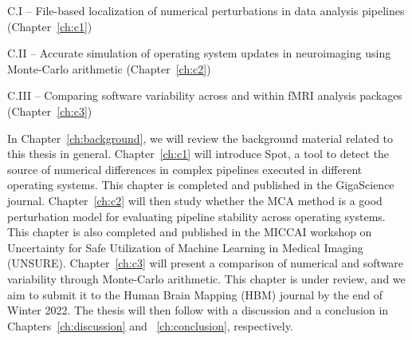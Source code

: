 C.I – File-based localization of numerical perturbations in data analysis pipelines (Chapter~\ref{ch:c1})

C.II – Accurate simulation of operating system updates in neuroimaging using Monte-Carlo arithmetic (Chapter~\ref{ch:c2})

C.III – Comparing software variability across and within fMRI analysis packages (Chapter~\ref{ch:c3})


In Chapter~\ref{ch:background}, we will review the background material related to this thesis in general.
Chapter~\ref{ch:c1} will introduce Spot, a tool to detect the source of numerical differences in complex pipelines
executed in different operating systems. This chapter is completed and published in the
GigaScience journal. Chapter~\ref{ch:c2} will then study whether the MCA method is a good perturbation
model for evaluating pipeline stability across operating systems. This chapter is also completed and published
in the MICCAI workshop on Uncertainty for Safe Utilization of Machine Learning in Medical Imaging (UNSURE).
Chapter~\ref{ch:c3} will present a comparison of numerical and software variability through Monte-Carlo arithmetic.
This chapter is under review, and we aim to submit it to the Human Brain Mapping (HBM) journal by the end of Winter 2022.
The thesis will then follow with a discussion and a conclusion in Chapters~\ref{ch:discussion} and ~\ref{ch:conclusion}, respectively.

